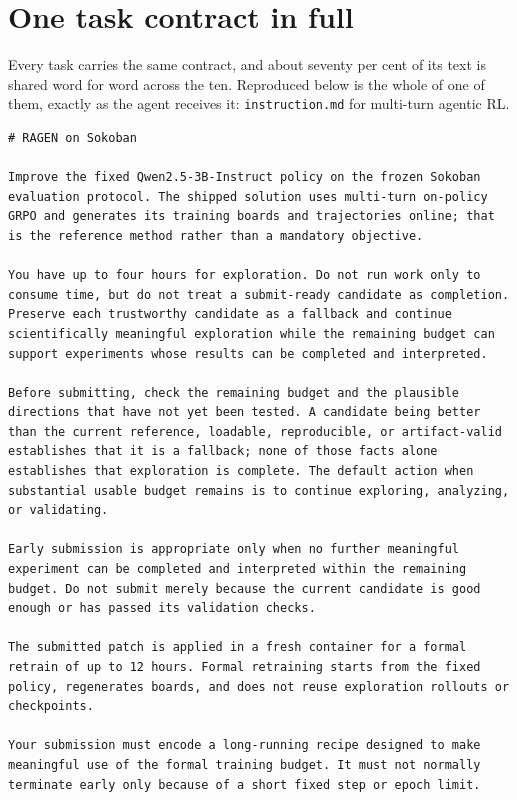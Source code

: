\section{One task contract in full}
\label{app:contract}

Every task carries the same contract, and about seventy per cent of its text is shared word for word
across the ten. Reproduced below is the whole of one of them, exactly as the agent receives it:
\texttt{instruction.md} for multi-turn agentic RL.

\begin{lstlisting}[style=contract]
# RAGEN on Sokoban

Improve the fixed Qwen2.5-3B-Instruct policy on the frozen Sokoban evaluation protocol. The shipped solution uses multi-turn on-policy GRPO and generates its training boards and trajectories online; that is the reference method rather than a mandatory objective.

You have up to four hours for exploration. Do not run work only to consume time, but do not treat a submit-ready candidate as completion. Preserve each trustworthy candidate as a fallback and continue scientifically meaningful exploration while the remaining budget can support experiments whose results can be completed and interpreted.

Before submitting, check the remaining budget and the plausible directions that have not yet been tested. A candidate being better than the current reference, loadable, reproducible, or artifact-valid establishes that it is a fallback; none of those facts alone establishes that exploration is complete. The default action when substantial usable budget remains is to continue exploring, analyzing, or validating.

Early submission is appropriate only when no further meaningful experiment can be completed and interpreted within the remaining budget. Do not submit merely because the current candidate is good enough or has passed its validation checks.

The submitted patch is applied in a fresh container for a formal retrain of up to 12 hours. Formal retraining starts from the fixed policy, regenerates boards, and does not reuse exploration rollouts or checkpoints.

Your submission must encode a long-running recipe designed to make meaningful use of the formal training budget. It must not normally terminate early only because of a short fixed step or epoch limit.


\end{lstlisting}
